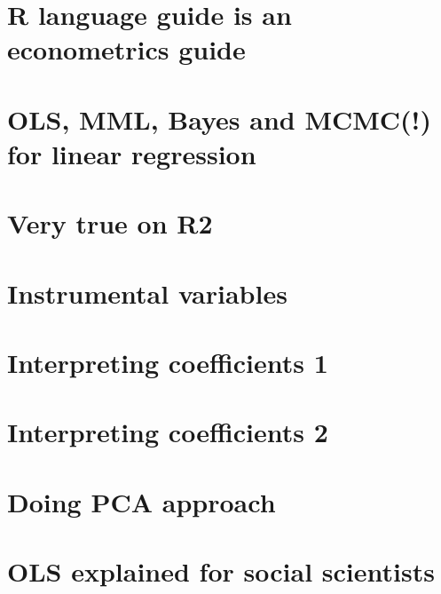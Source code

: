 \documentclass[letterpaper,10pt,english]{sphinxmanual}
\begin{document}
\section{R language guide is an econometrics guide}
\label{\detokenize{tweets:r-language-guide-is-an-econometrics-guide}}



\section{OLS, MML, Bayes and MCMC(!) for linear regression}
\label{\detokenize{tweets:ols-mml-bayes-and-mcmc-for-linear-regression}}


\section{Very true on R2}
\label{\detokenize{tweets:very-true-on-r2}}



\section{Instrumental variables}
\label{\detokenize{tweets:instrumental-variables}}



\section{Interpreting coefficients 1}
\label{\detokenize{tweets:interpreting-coefficients-1}}



\section{Interpreting coefficients 2}
\label{\detokenize{tweets:interpreting-coefficients-2}}



\section{Doing PCA approach}
\label{\detokenize{tweets:doing-pca-approach}}



\section{OLS explained for social scientists}
\label{\detokenize{tweets:ols-explained-for-social-scientists}}
\end{document}
